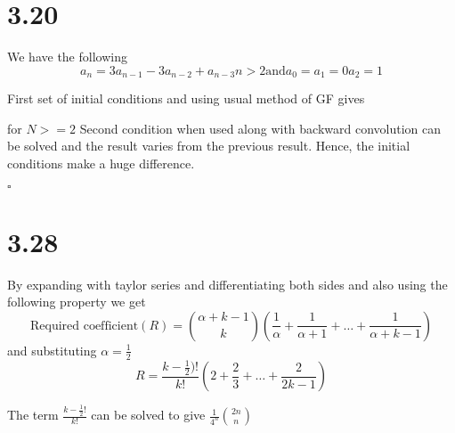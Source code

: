 \documentclass[a4paper,12pt]{article}
\begin{document}
\section*{3.20}
	We have the following
	\begin{equation}
		a_n = 3a_{n-1} - 3a_{n-2} + a_{n-3} n>2 \text{and} a_0 = a_1 = 0 a_2 = 1
	\end{equation}

	First set of initial conditions and using usual method of GF gives
	\centerline{}
	for $ N >= 2 $
	Second condition when used along with backward convolution can be solved and the result varies from the previous result. Hence, the initial conditions make a huge difference. 
	\centerline{}
	$\square$
\section*{3.28}
	By expanding with taylor series and differentiating both sides and also using the following property
		we get
	\begin{equation*}
		\text{Required coefficient}(R) = \binom{\alpha+k-1}{k} \left( \frac{1}{\alpha} + \frac{1}{\alpha + 1} + \ldots + \frac{1}{\alpha + k -1} \right)
	\end{equation*}
	and substituting $\alpha = \frac{1}{2}$
	\begin{equation*}
		R = \frac{k-\frac{1}{2})!}{k!} \left( 2 + \frac{2}{3} + \ldots + \frac{2}{2k-1} \right)
	\end{equation*}

	The term $\frac{k-\frac{1}{2}!}{k!}$ can be solved to give $\frac{1}{4^n}\binom{2n}{n}$
\end{document}
